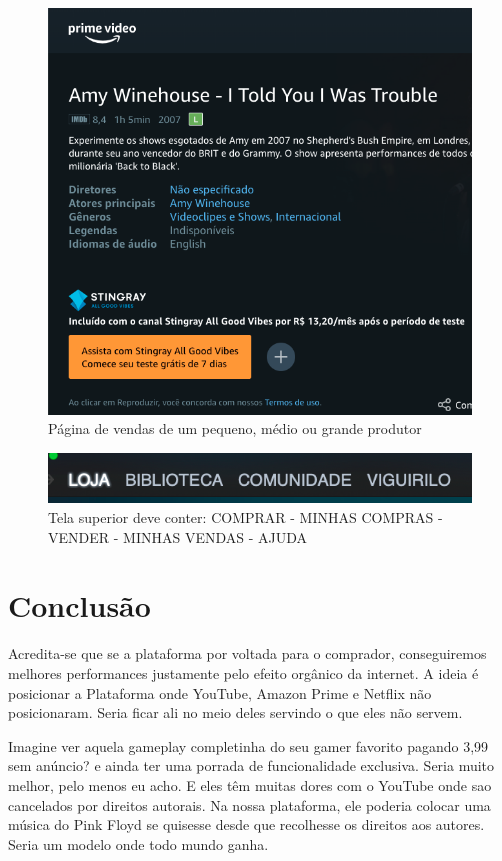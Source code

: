 \documentclass[a4paper,twoside]{article}
\begin{document}
\begin{figure}[H]
    \centering
    \includegraphics[scale=0.40,keepaspectratio=true]{images/06.png}
    \caption{Página de vendas de um pequeno, médio ou grande produtor}
\end{figure}

\begin{figure}[H]
    \centering
    \includegraphics[scale=0.50,keepaspectratio=true]{images/07.png}
    \caption{Tela superior deve conter: COMPRAR - MINHAS COMPRAS - VENDER - MINHAS VENDAS - AJUDA}
\end{figure}

\section{Conclusão}

Acredita-se que se a plataforma por voltada para o comprador, conseguiremos melhores performances justamente pelo efeito orgânico da internet. A ideia é posicionar a Plataforma onde YouTube, Amazon Prime e Netflix não posicionaram. Seria ficar ali no meio deles servindo o que eles não servem. 

Imagine ver aquela gameplay completinha do seu gamer favorito pagando 3,99 sem anúncio? e ainda ter uma porrada de funcionalidade exclusiva. Seria muito melhor, pelo menos eu acho. E eles têm muitas dores com o YouTube onde sao cancelados por direitos autorais. Na nossa plataforma, ele poderia colocar uma música do Pink Floyd se quisesse desde que recolhesse os direitos aos autores. Seria um modelo onde todo mundo ganha.
\end{document}
